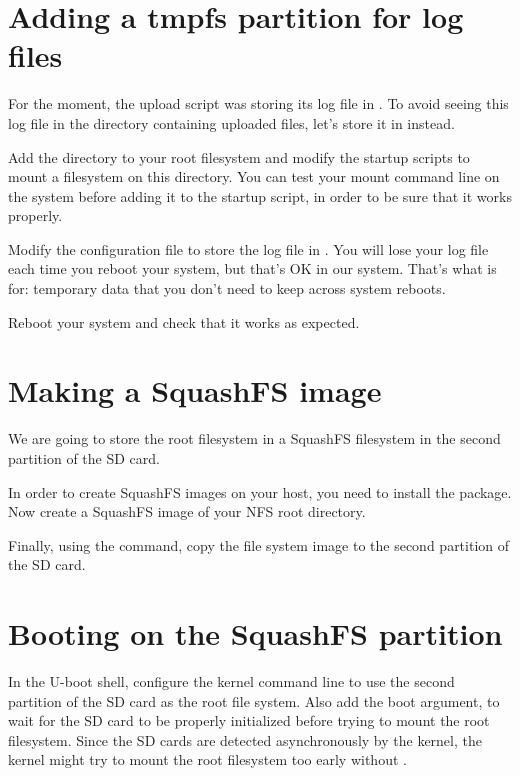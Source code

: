 \section{Adding a tmpfs partition for log files}

For the moment, the upload script was storing its log file in
. To avoid seeing this log file in
the directory containing uploaded files, let's store it in
 instead.

Add the  directory to your root filesystem and modify
the startup scripts to mount a  filesystem on this
directory. You can test your  mount command line on the
system before adding it to the startup script, in order to be sure
that it works properly.

Modify the  configuration file to store
the log file in . You will lose your log
file each time you reboot your system, but that's OK in our
system. That's what  is for: temporary data that you don't need
to keep across system reboots.

Reboot your system and check that it works as expected.

\section{Making a SquashFS image}

We are going to store the root filesystem in a SquashFS filesystem in
the second partition of the SD card.

In order to create SquashFS images on your host, you need to install
the  package. Now create a SquashFS image of your
NFS root directory.

Finally, using the  command, copy the file system image to
the second partition of the SD card.

\section{Booting on the SquashFS partition}

In the U-boot shell, configure the kernel command line to use the
second partition of the SD card as the root file system. Also add the
 boot argument, to wait for the SD card to be properly
initialized before trying to mount the root filesystem. Since the SD
cards are detected asynchronously by the kernel, the kernel might try
to mount the root filesystem too early without .

